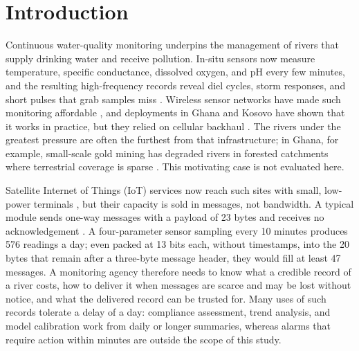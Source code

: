 \section{Introduction}
\label{sec:intro}

Continuous water-quality monitoring underpins the management of rivers that supply drinking water and receive pollution. In-situ sensors now measure temperature, specific conductance, dissolved oxygen, and pH every few minutes, and the resulting high-frequency records reveal diel cycles, storm responses, and short pulses that grab samples miss \citep{rode2016}. Wireless sensor networks have made such monitoring affordable \citep{adumanu2017}, and deployments in Ghana and Kosovo have shown that it works in practice, but they relied on cellular backhaul \citep{adumanu2020,ahmedi2022}. The rivers under the greatest pressure are often the furthest from that infrastructure; in Ghana, for example, small-scale gold mining has degraded rivers in forested catchments where terrestrial coverage is sparse \citep{duncan2020}. This motivating case is not evaluated here.

Satellite Internet of Things (IoT) services now reach such sites with small, low-power terminals \citep{centenaro2021}, but their capacity is sold in messages, not bandwidth. A typical module sends one-way messages with a payload of 23 bytes and receives no acknowledgement \citep{kineis2023kim1}. A four-parameter sensor sampling every 10 minutes produces 576 readings a day; even packed at 13 bits each, without timestamps, into the 20 bytes that remain after a three-byte message header, they would fill at least 47 messages. A monitoring agency therefore needs to know what a credible record of a river costs, how to deliver it when messages are scarce and may be lost without notice, and what the delivered record can be trusted for. Many uses of such records tolerate a delay of a day: compliance assessment, trend analysis, and model calibration work from daily or longer summaries, whereas alarms that require action within minutes are outside the scope of this study.

